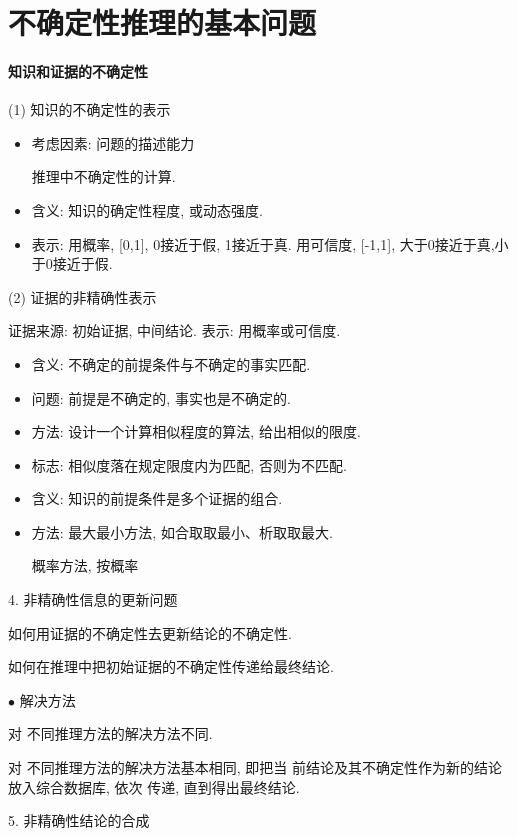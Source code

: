 \section{不确定性推理的基本问题 }\label{AI32C6Sec6.2}
\paragraph{知识和证据的不确定性}

(1) 知识的不确定性的表示
\begin{itemize}
\item 考虑因素: 问题的描述能力

      推理中不确定性的计算.

\item 含义: 知识的确定性程度, 或动态强度.
\item 表示: 用概率, [0,1], 0接近于假, 1接近于真. 用可信度, [-1,1], 大于0接近于真,小于0接近于假.
\end{itemize}

(2) 证据的非精确性表示

    证据来源: 初始证据, 中间结论.
    表示: 用概率或可信度.
\begin{itemize}
\item 含义: 不确定的前提条件与不确定的事实匹配.
\item 问题: 前提是不确定的, 事实也是不确定的.
\item 方法: 设计一个计算相似程度的算法, 给出相似的限度.
\item 标志: 相似度落在规定限度内为匹配, 否则为不匹配.
\item 含义: 知识的前提条件是多个证据的组合.
\item 方法: 最大最小方法, 如合取取最小、析取取最大.

    概率方法, 按概率
\end{itemize}

4. 非精确性信息的更新问题

   \qquad {} 如何用证据的不确定性去更新结论的不确定性.

   \qquad  {} 如何在推理中把初始证据的不确定性传递给最终结论.

    $\bullet$ 解决方法

   \qquad  对 不同推理方法的解决方法不同.

   \qquad  对 不同推理方法的解决方法基本相同, 即把当 前结论及其不确定性作为新的结论放入综合数据库, 依次 传递, 直到得出最终结论.

5. 非精确性结论的合成

